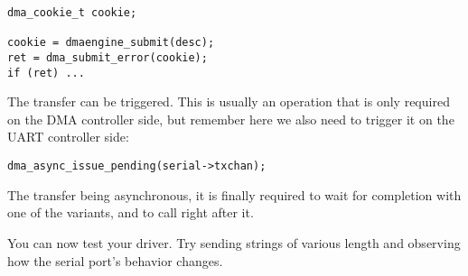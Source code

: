 \begin{verbatim}
dma_cookie_t cookie;

cookie = dmaengine_submit(desc);
ret = dma_submit_error(cookie);
if (ret) ...
\end{verbatim}

The transfer can be triggered. This is usually an operation that is only
required on the DMA controller side, but remember here we also need to trigger
it on the UART controller side:

\begin{verbatim}
dma_async_issue_pending(serial->txchan);
\end{verbatim}

The transfer being asynchronous, it is finally required to wait for completion
with one of the  variants, and to call
 right after it.

You can now test your driver. Try sending strings of various length and observing how the serial port's behavior changes.

